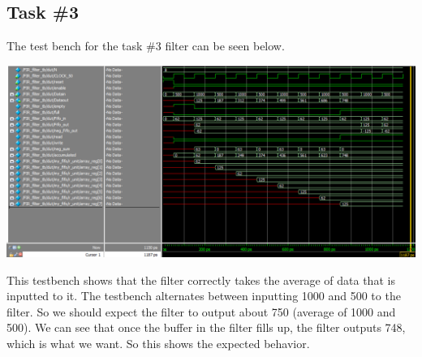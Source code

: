 \documentclass[11pt, titlepage]{article}
\begin{document}
        \subsection{Task \#3}
            The test bench for the task \#3 filter can be seen below. \\
            \begin{center}
                \includegraphics[scale = 0.5]{Images/task 3 filter testbench.png}
            \end{center}
            This testbench shows that the filter correctly takes the average of data that is inputted to it. The testbench alternates between inputting 1000 and 500 to the filter. So we should expect the filter to output about 750 (average of 1000 and 500). We can see that once the buffer in the filter fills up, the filter outputs 748, which is what we want. So this shows the expected behavior.
\end{document}
